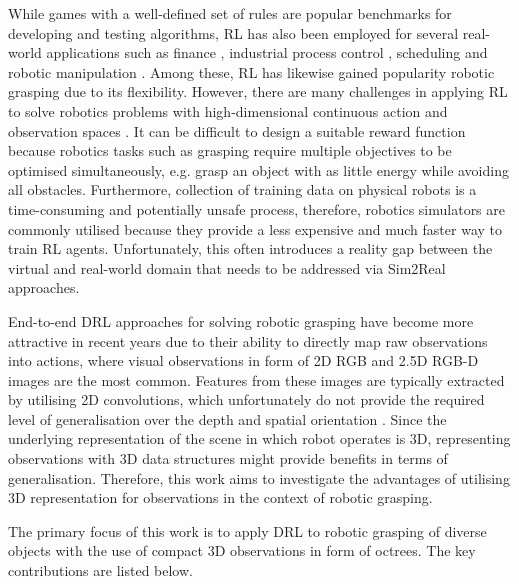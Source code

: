 While games with a well-defined set of rules are popular benchmarks for developing and testing algorithms, RL has also been employed for several real-world applications such as finance \cite{fischer_reinforcement_2018}, industrial process control \cite{nian_review_2020}, scheduling \cite{shyalika_reinforcement_2020} and robotic manipulation \cite{kroemer_review_2021}. Among these, RL has likewise gained popularity robotic grasping due to its flexibility. However, there are many challenges in applying RL to solve robotics problems with high-dimensional continuous action and observation spaces \cite{kroemer_review_2021}. It can be difficult to design a suitable reward function because robotics tasks such as grasping require multiple objectives to be optimised simultaneously, e.g. grasp an object with as little energy while avoiding all obstacles. Furthermore, collection of training data on physical robots is a time-consuming and potentially unsafe process, therefore, robotics simulators are commonly utilised because they provide a less expensive and much faster way to train RL agents. Unfortunately, this often introduces a reality gap between the virtual and real-world domain that needs to be addressed via Sim2Real approaches.

End-to-end DRL approaches for solving robotic grasping have become more attractive in recent years due to their ability to directly map raw observations into actions, where visual observations in form of 2D RGB and 2.5D RGB-D images are the most common. Features from these images are typically extracted by utilising 2D convolutions, which unfortunately do not provide the required level of generalisation over the depth and spatial orientation \cite{gualtieri_pick_2018}. Since the underlying representation of the scene in which robot operates is 3D, representing observations with 3D data structures might provide benefits in terms of generalisation. Therefore, this work aims to investigate the advantages of utilising 3D representation for observations in the context of robotic grasping.

The primary focus of this work is to apply DRL to robotic grasping of diverse objects with the use of compact 3D observations in form of octrees. The key contributions are listed below.

